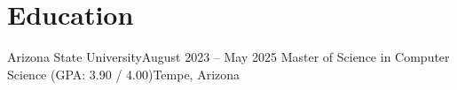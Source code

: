 \section{Education}
    \resumeSubHeadingListStart

    \resumeSubheading
    {Arizona State University}{August 2023 -- May 2025}
    {Master of Science in Computer Science (GPA: 3.90 / 4.00)}{Tempe, Arizona}

    \resumeSubHeadingListEnd